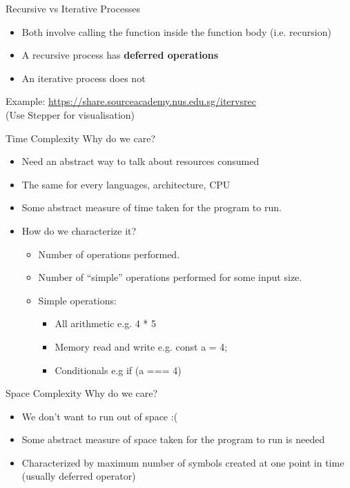 \documentclass[10pt]{beamer}
\begin{document}
\begin{frame}[fragile]{Recursive vs Iterative Processes}
  \begin{itemize}
    \item Both involve calling the function inside the function body (i.e. recursion)
    \item A recursive process has \textbf{deferred operations}
    \item An iterative process does not
  \end{itemize}  
    Example: \href{https://share.sourceacademy.nus.edu.sg/itervsrec}{\underline{https://share.sourceacademy.nus.edu.sg/itervsrec}} \\
    (Use Stepper for visualisation)
\end{frame}

\begin{frame}[fragile]{Time Complexity}
Why do we care?
  \begin{itemize}
    \item Need an abstract way to talk about resources consumed
    \item The same for every languages, architecture, CPU
    \item Some abstract measure of time taken for the program to run.
    \item How do we characterize it?
    \begin{itemize}
      \item Number of operations performed.
      \item Number of “simple” operations performed for some input size.
      \item Simple operations:
      \begin{itemize}
        \item All arithmetic e.g. 4 * 5
        \item Memory read and write e.g. const a = 4;
        \item Conditionals e.g if (a === 4)
      \end{itemize}
    \end{itemize}
  \end{itemize}  
\end{frame}

\begin{frame}[fragile]{Space Complexity}
Why do we care?
  \begin{itemize}
    \item We don't want to run out of space :(
    \item Some abstract measure of space taken for the program to run is needed
    \item Characterized by maximum number of symbols created at one point in time (usually deferred operator)
  \end{itemize}
\end{frame}
\end{document}
